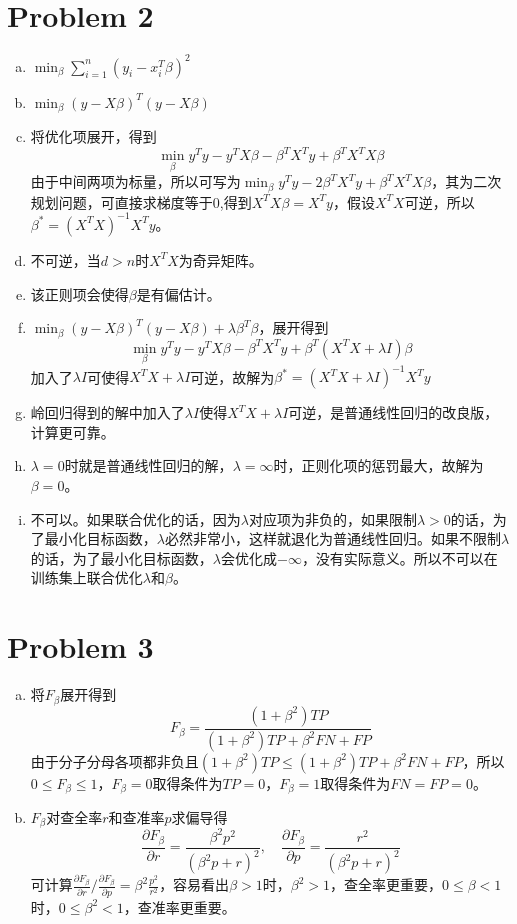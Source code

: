 \documentclass[a4paper,UTF8]{article}
\numberwithin{equation}{section}
\begin{document}
\section*{Problem 2}
\begin{enumerate}[(a)]
	\item $\min_\beta\sum_{i=1}^{n}(y_i-x_i^T\beta)^2$
	\item $\min_\beta(y-X\beta)^T(y-X\beta)$
	\item 将优化项展开，得到$$\min_\beta y^Ty-y^TX\beta-\beta^TX^Ty+\beta^TX^TX\beta$$
	      由于中间两项为标量，所以可写为$\min_\beta y^Ty-2\beta^TX^Ty+\beta^TX^TX\beta$，其为二次规划问题，可直接求梯度等于0,得到$X^TX\beta=X^Ty$，假设$X^TX$可逆，所以$\beta^*=(X^TX)^{-1}X^Ty$。
	\item 不可逆，当$d>n$时$X^TX$为奇异矩阵。
	\item 该正则项会使得$\beta$是有偏估计。
	\item $\min_\beta(y-X\beta)^T(y-X\beta)+\lambda\beta^T\beta$，展开得到$$\min_\beta y^Ty-y^TX\beta-\beta^TX^Ty+\beta^T(X^TX+\lambda I)\beta$$
	      加入了$\lambda I$可使得$X^TX+\lambda I$可逆，故解为$\beta^*=(X^TX+\lambda I)^{-1}X^Ty$
	 \item 岭回归得到的解中加入了$\lambda I$使得$X^TX+\lambda I$可逆，是普通线性回归的改良版，计算更可靠。
	 \item $\lambda=0$时就是普通线性回归的解，$\lambda=\infty$时，正则化项的惩罚最大，故解为$\beta=0$。
	 \item 不可以。如果联合优化的话，因为$\lambda$对应项为非负的，如果限制$\lambda>0$的话，为了最小化目标函数，$\lambda$必然非常小，这样就退化为普通线性回归。如果不限制$\lambda$的话，为了最小化目标函数，$\lambda$会优化成$-\infty$，没有实际意义。所以不可以在训练集上联合优化$\lambda$和$\beta$。
\end{enumerate}
\section*{Problem 3}
\begin{enumerate}[(a)]
    \item 将$F_\beta$展开得到$$F_\beta=\frac{(1+\beta^2)TP}{(1+\beta^2)TP+\beta^2 FN+FP}$$由于分子分母各项都非负且$(1+\beta^2)TP\leq (1+\beta^2)TP+\beta^2 FN+FP$，所以$0\leq F_\beta\leq 1$，$F_\beta=0$取得条件为$TP=0$，$F_\beta=1$取得条件为$FN=FP=0$。
    \item $F_\beta$对查全率$r$和查准率$p$求偏导得$$\frac{\partial F_\beta}{\partial r}=\frac{\beta^2p^2}{(\beta^2p+r)^2},\quad\frac{\partial F_\beta}{\partial p}=\frac{r^2}{(\beta^2p+r)^2}$$
    可计算$\frac{\partial F_\beta}{\partial r}/\frac{\partial F_\beta}{\partial p}=\beta^2\frac{p^2}{r^2}$，容易看出$\beta>1$时，$\beta^2>1$，查全率更重要，$0\leq\beta<1$时，$0\leq\beta^2<1$，查准率更重要。
\end{enumerate}
\end{document}
